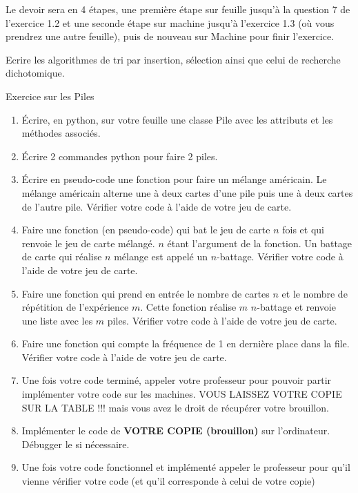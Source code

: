 \documentclass[12pt,fleqn]{report} %
\begin{document}
Le devoir sera en 4 étapes, une première étape sur feuille jusqu'à la question 7 de l'exercice 1.2 et une seconde étape sur machine jusqu'à l'exercice 1.3 (où vous prendrez une autre feuille), puis de nouveau sur Machine pour finir l'exercice.

\begin{exercise}
	Ecrire les algorithmes de tri par insertion, sélection ainsi que celui de recherche dichotomique. 
\end{exercise}

\begin{exercise}
	Exercice sur les Piles
	\begin{enumerate}
		\item \'Ecrire, en python, sur votre feuille une classe Pile avec les attributs et les méthodes associés. 
		\item \'Ecrire 2 commandes python pour faire 2 piles.
		\item \'Ecrire en pseudo-code une fonction pour faire un mélange américain. Le mélange américain alterne une à deux cartes d'une pile puis une à deux cartes de l'autre pile. Vérifier votre code à l'aide de votre jeu de carte.
		\item Faire une fonction (en pseudo-code) qui bat le jeu de carte $n$ fois et qui renvoie le jeu de carte mélangé. $n$ étant l'argument de la fonction. Un battage de carte qui réalise $n$ mélange est appelé un $n$-battage.
		Vérifier votre code à l'aide de votre jeu de carte.
		\item Faire une fonction qui prend en entrée le nombre de cartes $n$ et le nombre de répétition de l'expérience $m$. Cette fonction réalise $m$ $n$-battage et renvoie une liste avec les $m$ piles.
		Vérifier votre code à l'aide de votre jeu de carte.
		\item Faire une fonction qui compte la fréquence de 1 en dernière place dans la file.
		Vérifier votre code à l'aide de votre jeu de carte.
		\item Une fois votre code terminé, appeler votre professeur pour pouvoir partir implémenter votre code sur les machines. VOUS LAISSEZ VOTRE COPIE SUR LA TABLE !!! mais vous avez le droit de récupérer votre brouillon.
		\item Implémenter le code de \textbf{VOTRE COPIE (brouillon)} sur l'ordinateur. Débugger le si nécessaire.
		\item Une fois votre code fonctionnel et implémenté appeler le professeur pour qu'il vienne vérifier votre code (et qu'il corresponde à celui de votre copie)
	\end{enumerate}
\end{exercise}
\end{document}
